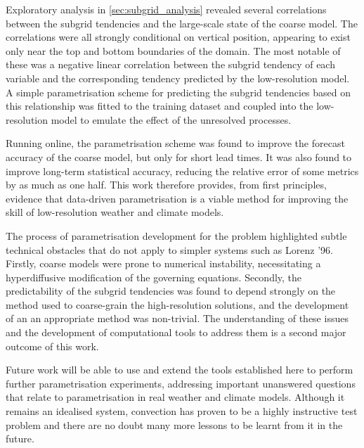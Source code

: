 \documentclass[../main.tex]{subfiles}
\begin{document}
Exploratory analysis in \cref{sec:subgrid_analysis} revealed several
correlations between the subgrid tendencies and the large-scale state of the
coarse model. The correlations were all strongly conditional on vertical
position, appearing to exist only near the top and bottom boundaries of the
domain. The most notable of these was a negative linear correlation between the
subgrid tendency of each variable and the corresponding tendency predicted by
the low-resolution model. A simple parametrisation scheme for predicting the
subgrid tendencies based on this relationship was fitted to the training
dataset and coupled into the low-resolution model to emulate the effect of the
unresolved processes.

Running online, the parametrisation scheme was found to improve the forecast
accuracy of the coarse model, but only for short lead times. It was also found
to improve long-term statistical accuracy, reducing the relative error of some
metrics by as much as one half. This work therefore provides, from first
principles, evidence that data-driven parametrisation is a viable method for
improving the skill of low-resolution weather and climate models.

The process of parametrisation development for the \rb{} problem highlighted
subtle technical obstacles that do not apply to simpler systems such as Lorenz
'96. Firstly, coarse models were prone to numerical instability, necessitating
a hyperdiffusive modification of the governing equations. Secondly, the
predictability of the subgrid tendencies was found to depend strongly on the
method used to coarse-grain the high-resolution solutions, and the development
of an an appropriate method was non-trivial. The understanding of these issues
and the development of computational tools to address them is a second major
outcome of this work.

Future work will be able to use and extend the tools established here to
perform further parametrisation experiments, addressing important
unanswered questions that relate to parametrisation in real weather and climate
models. Although it remains an idealised system, \rb{} convection has proven to
be a highly instructive test problem and there are no doubt many more lessons
to be learnt from it in the future.


\ifSubfilesClassLoaded{%
    \emergencystretch=5em
    \printbibliography{}
}{}
\end{document}
